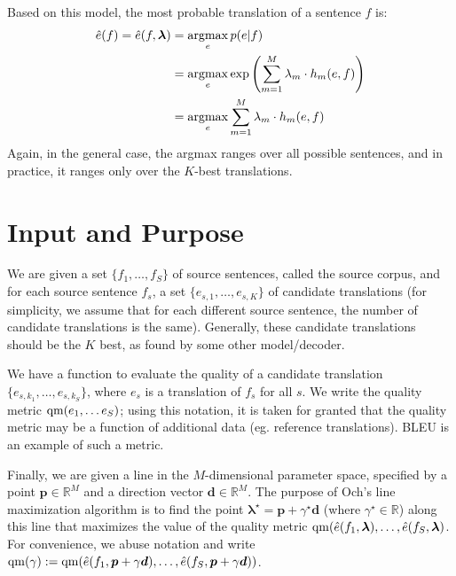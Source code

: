 \documentclass[12pt]{amsart}
\newcommand{\argmax}{\mathop{\rm argmax}}
\newcommand{\qm}{{\rm qm}}
\begin{document}
Based on this model, the most probable translation of a sentence $f$ is:
\begin{align}
\hat{e}(f) = \hat{e}(f, \boldsymbol{\lambda}) &= \argmax_{e} p(e|f) \notag \\
&= \argmax_{e} \exp \left( \sum_{m=1}^M \lambda_m \cdot h_m(e,f) \right) \notag \\
&= \argmax_{e} \sum_{m=1}^M \lambda_m \cdot h_m(e,f) \label{eq:e(f)}
\end{align}
Again, in the general case, the argmax ranges over all possible sentences, and in practice, it ranges only over the $K$-best translations.

\section{Input and Purpose\label{sec:input}}
We are given a set $\{f_1, \dots , f_S\}$ of source sentences, called the source corpus, and for each source sentence $f_s$, a set $\{e_{s,1}, \dots , e_{s,K}\}$ of candidate translations (for simplicity, we assume that for each different source sentence, the number of candidate translations is the same).
Generally, these candidate translations should be the $K$ best, as found by some other model/decoder.

We have a function to evaluate the quality of a candidate translation $\{e_{s,k_1}, \dots , e_{s,k_S}\}$, where $e_s$ is a translation of $f_s$ for all $s$.
We write the quality metric $\qm(e_1, \dots e_S)$; using this notation, it is taken for granted that the quality metric may be a function of additional data (eg. reference translations).
BLEU is an example of such a metric.%

Finally, we are given a line in the $M$-dimensional parameter space, specified by a point $\boldsymbol{p} \in \mathbb{R}^M$ and a direction vector $\boldsymbol{d} \in \mathbb{R}^M$.
The purpose of Och's line maximization algorithm is to find the point $\boldsymbol{\lambda}^\star = \boldsymbol{p} + \gamma^\star \boldsymbol{d}$ (where $\gamma^\star \in \mathbb{R}$) along this line that maximizes the value of the quality metric $\qm(\hat{e}(f_1, \boldsymbol{\lambda}), \dots , \hat{e}(f_S, \boldsymbol{\lambda})$. 
For convenience, we abuse notation and write $\qm(\gamma) := \qm(\hat{e}(f_1, \boldsymbol{p} + \gamma \boldsymbol{d}), \dots , \hat{e}(f_S, \boldsymbol{p} + \gamma \boldsymbol{d}))$.
\end{document}
